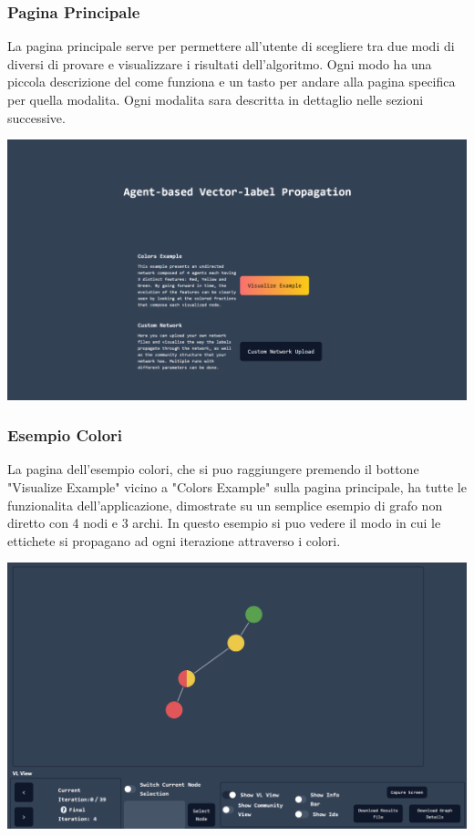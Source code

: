 \documentclass[a4paper,12pt]{report}
\begin{document}
			\subsubsection{Pagina Principale}
			La pagina principale serve per permettere all'utente di scegliere tra due modi di diversi di provare e visualizzare i risultati dell'algoritmo. Ogni modo ha una piccola descrizione del come funziona e un tasto per andare alla pagina specifica per quella modalita. Ogni modalita sara descritta in dettaglio nelle sezioni successive.\par
			\includegraphics[width=\textwidth,height=\textheight,keepaspectratio]{paginaprincipale}
	
			\subsubsection{Esempio Colori}
			La pagina dell'esempio colori, che si puo raggiungere premendo il bottone "Visualize Example" vicino a "Colors Example" sulla pagina principale, ha tutte le funzionalita dell'applicazione, dimostrate su un semplice esempio di grafo non diretto con 4 nodi e 3 archi. In questo esempio si puo vedere il modo in cui le ettichete si propagano ad ogni iterazione attraverso i colori. \par
			\includegraphics[width=\textwidth,height=\textheight,keepaspectratio]{colorsexample}	
\end{document}
